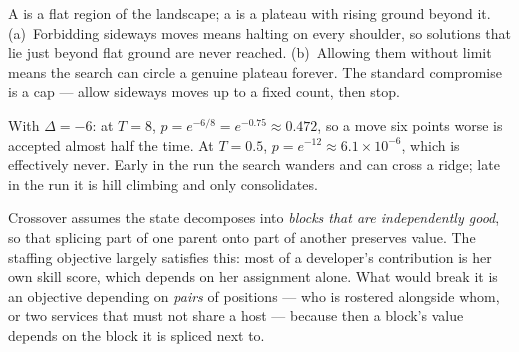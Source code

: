 \begin{ans}
  \item A  is a flat region of the landscape; a  is a
        plateau with rising ground beyond it. (a)~Forbidding sideways moves means
        halting on every shoulder, so solutions that lie just beyond flat ground
        are never reached. (b)~Allowing them without limit means the search can
        circle a genuine plateau forever. The standard compromise is a cap ---
        allow sideways moves up to a fixed count, then stop.
  \item With $\Delta = -6$: at $T = 8$, $p = e^{-6/8} = e^{-0.75} \approx 0.472$,
        so a move six points worse is accepted almost half the time. At $T = 0.5$,
        $p = e^{-12} \approx 6.1 \times 10^{-6}$, which is effectively never. Early
        in the run the search wanders and can cross a ridge; late in the run it is
        hill climbing and only consolidates.
  \item Crossover assumes the state decomposes into \emph{blocks that are
        independently good}, so that splicing part of one parent onto part of
        another preserves value. The staffing objective largely satisfies this:
        most of a developer's contribution is her own skill score, which depends on
        her assignment alone. What would break it is an objective depending on
        \emph{pairs} of positions --- who is rostered alongside whom, or two
        services that must not share a host --- because then a block's value
        depends on the block it is spliced next to.
\end{ans}

